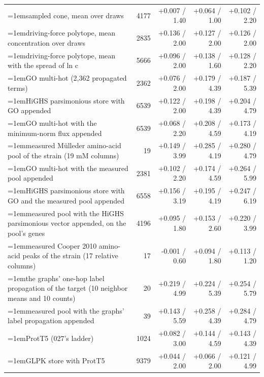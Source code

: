 \begin{table}[H]
\begin{tabular}{@{}>{\raggedright\hangindent=1em\hangafter=1\arraybackslash}p{108.6mm}rrrr@{}}
    sampled cone, mean over draws & 4177 & +0.007 / 1.40 & +0.064 / 1.00 & +0.102 / 2.20 \\
    driving-force polytope, mean concentration over draws & 2835 & +0.136 / 2.00 & +0.127 / 2.00 & +0.126 / 2.00 \\
    driving-force polytope, mean with the spread of ln c & 5666 & +0.096 / 2.00 & +0.138 / 1.60 & +0.128 / 2.20 \\
    GO multi-hot (2,362 propagated terms) & 2362 & +0.076 / 2.00 & +0.179 / 4.39 & +0.187 / 5.39 \\
    HiGHS parsimonious store with GO appended & 6539 & +0.122 / 2.00 & +0.198 / 4.39 & +0.204 / 4.79 \\
    GO multi-hot with the minimum-norm flux appended & 6539 & +0.068 / 2.20 & +0.208 / 4.59 & +0.173 / 4.19 \\
    measured M\"ulleder amino-acid pool of the strain (19 mM columns) & 19 & +0.149 / 3.99 & +0.285 / 4.19 & +0.280 / 4.79 \\
    GO multi-hot with the measured pool appended & 2381 & +0.102 / 2.20 & +0.174 / 4.59 & +0.264 / 5.99 \\
    HiGHS parsimonious store with GO and the measured pool appended & 6558 & +0.156 / 3.19 & +0.195 / 4.19 & +0.247 / 6.19 \\
    measured pool with the HiGHS parsimonious vector appended, on the pool's genes & 4196 & +0.095 / 1.80 & +0.153 / 2.60 & +0.220 / 3.99 \\
    measured Cooper 2010 amino-acid peaks of the strain (17 relative columns) & 17 & -0.001 / 0.60 & +0.094 / 1.80 & +0.113 / 1.20 \\
    the graphs' one-hop label propagation of the target (10 neighbor means and 10 counts) & 20 & +0.219 / 4.99 & +0.224 / 5.39 & +0.254 / 5.79 \\
    measured pool with the graphs' label propagation appended & 39 & +0.143 / 5.59 & +0.258 / 4.39 & +0.284 / 4.79 \\
    ProtT5 (027's ladder) & 1024 & +0.082 / 3.00 & +0.144 / 4.59 & +0.143 / 4.39 \\
    GLPK store with ProtT5 & 9379 & +0.044 / 2.00 & +0.066 / 2.00 & +0.121 / 4.99 \\
    \hline
  \end{tabular}
\end{table}
